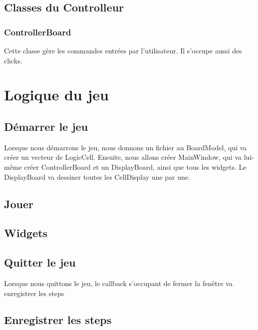 \documentclass[utf8]{article}
\begin{document}
\begin{large}
\subsection{Classes du Controlleur}
\subsubsection{ControllerBoard}
\par
\indent
Cette classe gère les commandes entrées par l'utilisateur. Il s'occupe aussi des
clicks.
\par

\par
\section{Logique du jeu}
\par
\indent
\subsection{Démarrer le jeu}
\par
\indent
Lorsque nous démarrons le jeu, nous donnons un fichier au BoardModel, qui va
créer un vecteur de LogicCell. Ensuite, nous allons créer MainWindow, qui va
lui-même créer ControllerBoard et un DisplayBoard, ainsi que tous les widgets.
Le DisplayBoard va dessiner toutes les CellDisplay une par une.


\par
\subsection{Jouer}
\par
\indent
\par

\subsection{Widgets}
\par
\indent
\par
\subsection{Quitter le jeu}
\par
\indent
Lorsque nous quittons le jeu, le callback s'occupant de fermer la fenêtre va enregistrer les steps
\par
\subsection{Enregistrer les steps}
\par
\indent
\par


\end{large}
\end{document}
